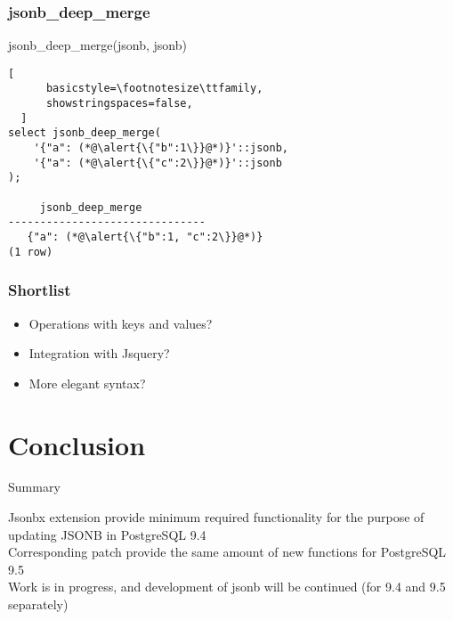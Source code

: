 \documentclass[14pt, compress]{beamer}
\begin{document}
\begin{frame}[fragile]
  \frametitle{jsonb\_deep\_merge}
  jsonb\_deep\_merge(jsonb, jsonb)

  \begin{lstlisting}[
      basicstyle=\footnotesize\ttfamily,
      showstringspaces=false,
  ]
select jsonb_deep_merge(
    '{"a": (*@\alert{\{"b":1\}}@*)}'::jsonb,
    '{"a": (*@\alert{\{"c":2\}}@*)}'::jsonb
);

     jsonb_deep_merge            
-------------------------------
   {"a": (*@\alert{\{"b":1, "c":2\}}@*)}
(1 row)

  \end{lstlisting}

\end{frame}

\begin{frame}[fragile]
  \frametitle{Shortlist}
  
  \begin{itemize}
      \item[\MVRightarrow] Operations with keys and values?
      \item[\MVRightarrow] Integration with Jsquery?
      \item[\MVRightarrow] More elegant syntax?
  \end{itemize}

\end{frame}

\section{Conclusion}

\begin{frame}{Summary}

  Jsonbx extension provide minimum required functionality for the purpose of updating JSONB in PostgreSQL 9.4\\
  Corresponding patch provide the same amount of new functions for PostgreSQL 9.5\\
  Work is in progress, and development of jsonb will be continued (for 9.4 and 9.5 separately)

\end{frame}

\end{document}
